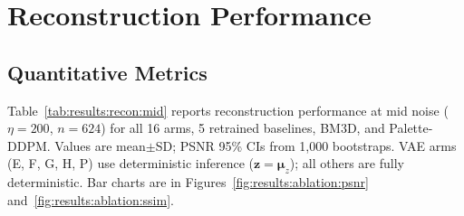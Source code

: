 \documentclass[12pt, a4paper, twoside, openright]{book}
\begin{document}
\begin{table}[htbp]
\end{table}

\section{Reconstruction Performance}
\label{sec:results:recon}

\subsection{Quantitative Metrics}
\label{sec:results:recon:quant}

Table~\ref{tab:results:recon:mid} reports reconstruction performance at mid noise ($\eta=200$, $n=624$) for all 16 arms, 5 retrained baselines, BM3D, and Palette-DDPM. Values are mean$\pm$SD; PSNR 95\% CIs from 1,000 bootstraps. VAE arms (E, F, G, H, P) use deterministic inference ($\mathbf{z}=\boldsymbol{\mu}_z$); all others are fully deterministic. Bar charts are in Figures~\ref{fig:results:ablation:psnr} and~\ref{fig:results:ablation:ssim}.
\end{document}

